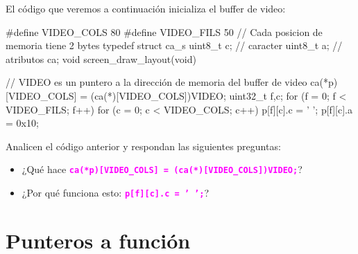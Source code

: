 \documentclass[]{scrartcl}
\newcommand{\hl}[1]{\textcolor{magenta}{\textbf{\texttt{#1}}}}
\begin{document}
El código que veremos a continuación inicializa el buffer de video:

\begin{cbox}[]{}
  #define VIDEO_COLS 80
  #define VIDEO_FILS 50
  // Cada posicion de memoria tiene 2 bytes
  typedef struct ca_s {
    uint8_t c; // caracter
    uint8_t a; // atributos
  } ca;
  void screen_draw_layout(void) {

    // VIDEO es un puntero a la dirección de memoria del buffer de video
    ca(*p)[VIDEO_COLS] = (ca(*)[VIDEO_COLS])VIDEO;
    uint32_t f,c;
    for (f = 0; f <  VIDEO_FILS; f++) {
      for (c = 0; c < VIDEO_COLS; c++) {
        p[f][c].c = ' ';
        p[f][c].a = 0x10;
      }
    }
  }
\end{cbox}

\begin{exbox}
  Analicen el código anterior y respondan las siguientes preguntas:
  \begin{itemize}
    \item ¿Qué hace \hl{ca(*p)[VIDEO\_COLS] = (ca(*)[VIDEO\_COLS])VIDEO;}?
    \item ¿Por qué funciona esto: \hl{p[f][c].c = ' ';}?
  \end{itemize}
\end{exbox}

\newpage
\section*{Punteros a función}
\end{document}
